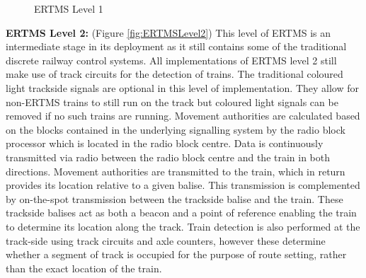 \begin{center}
\begin{figure}[h!]



 \caption{ERTMS Level 1}
\label{fig:ERTMSLevel1}
\end{figure}
\end{center}

\textbf{ERTMS Level 2:}  (Figure \ref{fig:ERTMSLevel2}) This level of ERTMS is an intermediate stage in its deployment as it still contains some of the traditional discrete railway control systems. All implementations of ERTMS level 2 still make use of track circuits for the detection of trains. The traditional coloured light trackside signals are optional in this level of implementation. They allow for non-ERTMS trains to still run on the track but coloured light signals can be removed if no such trains are running. Movement authorities are calculated based on the blocks contained in the underlying signalling system by the radio block processor which is located in the radio block centre. Data is continuously transmitted via radio between the radio block centre and the train in both directions. Movement authorities are transmitted to the train, which in return provides its location relative to a given balise. This transmission is complemented by on-the-spot transmission between the trackside balise and the train. These trackside balises act as both a beacon and a point of reference enabling the train to determine its location along the track. Train detection is also performed at the track-side using track circuits and axle counters, however these determine whether a segment of track is occupied for the purpose of route setting, rather than the exact location of the train. 



